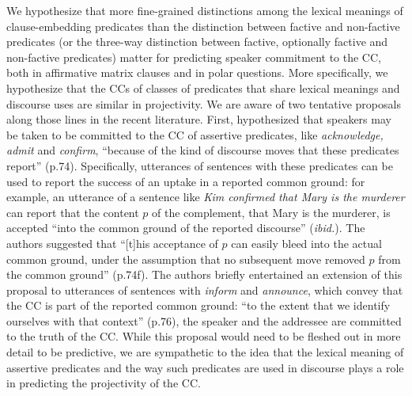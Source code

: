 \documentclass[11pt,fleqn]{article}
\newcommand{\6}{\mbox{$[\hspace*{-.6mm}[$}}
\newcommand{\9}{\mbox{$]\hspace*{-.6mm}]$}}
\begin{document}
{We hypothesize that more fine-grained distinctions among the lexical meanings of clause-embedding predicates than the distinction between factive and non-factive predicates (or the three-way distinction between factive, optionally factive and non-factive predicates) matter for predicting speaker commitment to the CC, both in affirmative matrix clauses and in polar questions. More specifically, we hypothesize that the CCs of classes of predicates that share lexical meanings and discourse uses are similar in projectivity. We are aware of two tentative proposals along those lines in the recent literature. First, \citet{anand-hacquard2014} hypothesized that speakers may be taken to be committed to the CC of assertive predicates, like {\em acknowledge, admit} and {\em confirm},  ``because of the kind of discourse moves that these predicates report'' (p.74). Specifically, utterances of sentences with these predicates can be used to report the success of an uptake in a reported common ground: for example, an utterance of a sentence like {\em Kim confirmed that Mary is the murderer} can report that the content $p$ of the  complement, that Mary is the murderer, is accepted ``into the common ground of the reported discourse'' ({\em ibid.}). The authors suggested that ``[t]his acceptance of $p$ can easily bleed into the actual common ground, under the assumption that no subsequent move removed $p$ from the common ground'' (p.74f). The authors briefly entertained an extension of this proposal to utterances of sentences with {\em inform} and {\em announce}, which convey that the CC is part of the reported common ground: ``to the extent that we identify ourselves with that context'' (p.76), the speaker and the addressee are committed to the truth of the CC. While this proposal would need to be fleshed out in more detail to be predictive, we are sympathetic to the idea that the lexical meaning of assertive predicates and the way such predicates are used in discourse plays a role in predicting the projectivity of the CC.

}
\end{document}
